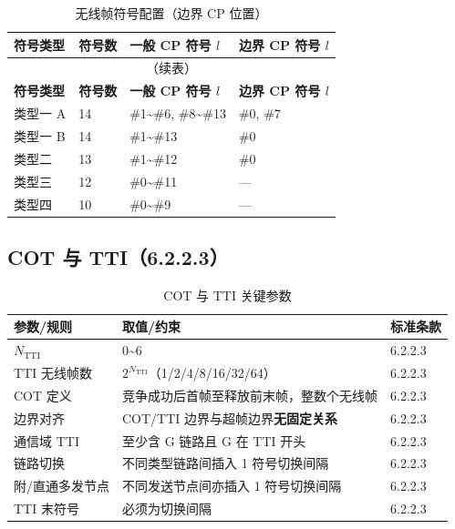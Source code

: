 \documentclass[11pt,a4paper]{ctexart}
\begin{document}
\begin{longtable}{llll}
\caption{无线帧符号配置（边界 CP 位置）\label{tab:622-boundary-cp}} \\
\toprule
\textbf{符号类型} & \textbf{符号数} & \textbf{一般 CP 符号 $l$} & \textbf{边界 CP 符号 $l$} \\
\midrule
\endfirsthead
\multicolumn{4}{c}{\small（续表）} \\
\toprule
\textbf{符号类型} & \textbf{符号数} & \textbf{一般 CP 符号 $l$} & \textbf{边界 CP 符号 $l$} \\
\midrule
\endhead
\bottomrule
\endfoot
类型一 A & 14 & \#1\textasciitilde\#6, \#8\textasciitilde\#13 & \#0, \#7 \\
类型一 B & 14 & \#1\textasciitilde\#13 & \#0 \\
类型二 & 13 & \#1\textasciitilde\#12 & \#0 \\
类型三 & 12 & \#0\textasciitilde\#11 & --- \\
类型四 & 10 & \#0\textasciitilde\#9 & --- \\
\end{longtable}

\subsection{COT 与 TTI（6.2.2.3）}

\begin{longtable}{lll}
\caption{COT 与 TTI 关键参数} \\
\toprule
\textbf{参数/规则} & \textbf{取值/约束} & \textbf{标准条款} \\
\midrule
$N_{\mathrm{TTI}}$ & 0\textasciitilde 6 & 6.2.2.3 \\
TTI 无线帧数 & $2^{N_{\mathrm{TTI}}}$（1/2/4/8/16/32/64） & 6.2.2.3 \\
COT 定义 & 竞争成功后首帧至释放前末帧，整数个无线帧 & 6.2.2.3 \\
边界对齐 & COT/TTI 边界与超帧边界\textbf{无固定关系} & 6.2.2.3 \\
通信域 TTI & 至少含 G 链路且 G 在 TTI 开头 & 6.2.2.3 \\
链路切换 & 不同类型链路间插入 1 符号切换间隔 & 6.2.2.3 \\
附/直通多发节点 & 不同发送节点间亦插入 1 符号切换间隔 & 6.2.2.3 \\
TTI 末符号 & 必须为切换间隔 & 6.2.2.3 \\
\bottomrule
\end{longtable}
\end{document}
